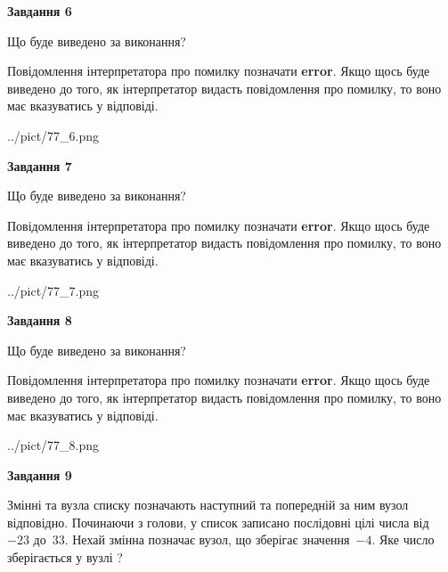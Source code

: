 \documentclass[12pt, ukrainian]{article}
\begin{document}
{\begin {large}
{\begin {center}\textbf{Завдання 6}\end {center}}\par
Що буде виведено за виконання?

Повідомлення інтерпретатора про помилку позначати \textbf{error}.
Якщо щось буде виведено до того, як інтерпретатор видасть повідомлення про помилку, 
то воно має вказуватись у відповіді. \par


\begin{center}
	{../pict/77_6.png}
\end{center}
\newpage

{\begin {center}\textbf{Завдання 7}\end {center}}\par
Що буде виведено за виконання?

Повідомлення інтерпретатора про помилку позначати \textbf{error}.
Якщо щось буде виведено до того, як інтерпретатор видасть повідомлення про помилку, 
то воно має вказуватись у відповіді. \par


\begin{center}
	{../pict/77_7.png}
\end{center}
\newpage

{\begin {center}\textbf{Завдання 8}\end {center}}\par
Що буде виведено за виконання?

Повідомлення інтерпретатора про помилку позначати \textbf{error}.
Якщо щось буде виведено до того, як інтерпретатор видасть повідомлення про помилку, 
то воно має вказуватись у відповіді. \par


\begin{center}
	{../pict/77_8.png}
\end{center}
\newpage

{\begin {center}\textbf{Завдання 9}\end {center}}\par
Змінні  та  вузла списку позначають наступний та попередній за ним вузол відповідно. Починаючи з голови, у список записано послідовні цілі числа від~$-23$ до~$33$. Нехай змінна  позначає вузол, що зберігає значення~$-4$.
Яке число зберігається у вузлі  ?\par
\newpage


\end{large}}
\end{document}
